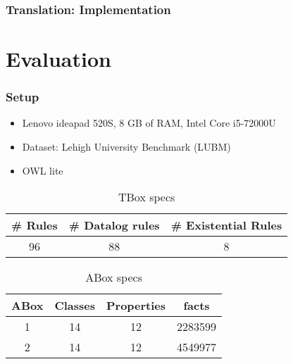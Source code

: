 \documentclass{beamer}
\begin{document}
\begin{frame}
\frametitle{Translation: Implementation}
\end{frame}

\section{Evaluation}
\begin{frame}
\frametitle{Setup}
\begin{itemize}
\item Lenovo ideapad 520S, 8 GB of RAM, Intel Core i5-72000U 
\item Dataset: Lehigh University Benchmark (LUBM)
\item OWL lite
\end{itemize}
\begin{table}
\centering
\begin{tabular}{|c|c|c|}
\hline
\# Rules & \# Datalog rules & \# Existential Rules \\
\hline
\hline
96 & 88 & 8 \\
\hline
\end{tabular}
\caption{TBox specs}
\end{table}

\begin{table}
\centering
\begin{tabular}{|c|c|c|c|}
\hline
ABox & Classes & Properties & facts \\
\hline
\hline
1 & 14 & 12 & 2283599 \\
2 & 14 & 12 & 4549977 \\
\hline
\end{tabular}
\caption{ABox specs}
\end{table}

\end{frame}


    
\end{document}
